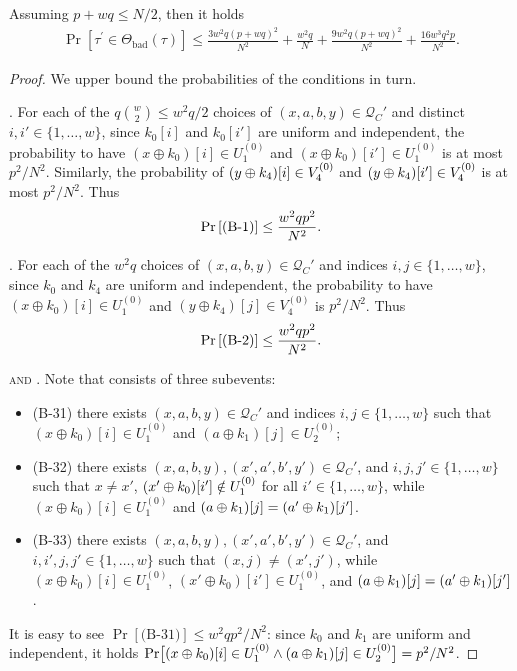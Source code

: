 \begin{lemma}
	\label{lemma:bad-tau-4-rounds}
	
	Assuming $p+wq\leq N/2$, then it holds
	\begin{align}
	\operatorname{Pr}[\tau^{\prime} \in \Theta_{\mathrm{bad}}(\tau)] \leq \frac{3w^{2} q \left(p+w q\right)^{2}}{N^{2}} + \frac{w^{2} q}{N} + \frac{9w^2 q (p+w q)^{2}}{N^2}+ \frac{16w^3q^2p}{N^2}.
	\label{eq:bound-bad-tau-4-rounds}
	\end{align}
\end{lemma}
\begin{proof}
We upper bound the probabilities of the conditions in turn.


\arrangespace

\noindent \textsc{\bone}.
%
For each of the $q{w\choose 2}\leq w^2q/2$ choices of $(x,a,b, y) \in \mathcal{Q}_{C}'$ and distinct $i, i' \in \{1, \ldots, w\}$, since $k_0[i]$ and $k_0[i']$ are uniform and independent, the probability to have $(x \oplus k_{0})[i]\in U_1^{(0)}$ and $(x \oplus k_0)[i']\in U_1^{(0)}$ is at most $p^2/N^2$. Similarly, the probability of $(y\oplus k_4)[i]\in V_4^{(0)}$ and $(y\oplus k_4)[i']\in V_4^{(0)}$ is at most $p^2/N^2$. Thus
%
$$
\operatorname{Pr}\left[\text{(B-1)}\right] \leq \frac{w^{2} q p^2}{N^{2}}.
$$
%




\noindent \textsc{\btwo}.
%
For each of the $w^2q$ choices of $(x,a,b,y)\in\mathcal{Q}_{C}'$ and indices $i, j \in \{1, \ldots, w\}$, since $k_{0}$ and $k_{4}$ are uniform and independent, the probability to have $(x \oplus k_{0})[i]\in U_1^{(0)}$ and $(y \oplus k_{4})[j]\in V_4^{(0)}$ is $p^2/N^2$. Thus
%
$$
\operatorname{Pr}\left[\text{(B-2)}\right] \leq \frac{w^{2} q p^2}{N^{2}}.
$$
%




\noindent \textsc{\bthree and \bfour}.
%
Note that \bthree consists of three subevents:
\begin{itemize}
	\item(B-31) there exists $(x,a,b,y) \in \mathcal{Q}_{C}'$ and indices $i, j \in \{1, \ldots, w\}$ such that $\left(x \oplus k_{0}\right)[i]\in U_1^{(0)}$ and $\left(a\oplus k_{1}\right)[j]\in U_2^{(0)}$;
	\item(B-32) there exists $(x,a,b,y),(x',a',b',y')\in\mathcal{Q}_{C}'$, and $i,j,j'\in\{1,\ldots,w\}$ such that $x\neq x'$, $(x'\oplus k_0)[i']\notin U_1^{(0)}$ for all $i'\in\{1,\ldots,w\}$, while $\left(x \oplus k_{0}\right)[i]\in U_1^{(0)}$ and $(a\oplus k_1)[j]=(a'\oplus k_1)[j']$.
	\item(B-33) there exists $(x,a,b,y),(x',a',b',y')\in\mathcal{Q}_{C}'$, and $i,i',j,j'\in\{1,\ldots,w\}$ such that $(x,j)\neq(x',j')$, while $\left(x \oplus k_{0}\right)[i]\in U_1^{(0)}$, $\left(x' \oplus k_{0}\right)[i']\in U_1^{(0)}$, and $(a\oplus k_1)[j]=(a'\oplus k_1)[j']$.
\end{itemize}
It is easy to see $\Pr[\text{(B-31)}]\leq w^2qp^2/N^2$: since $k_0$ and $k_1$ are uniform and independent, it holds ${\Pr}\big[(x\oplus k_0)[i]\in U_1^{(0)}\wedge(a\oplus k_1)[j]\in U_2^{(0)}\big]=p^2/N^2$.



\end{proof}
